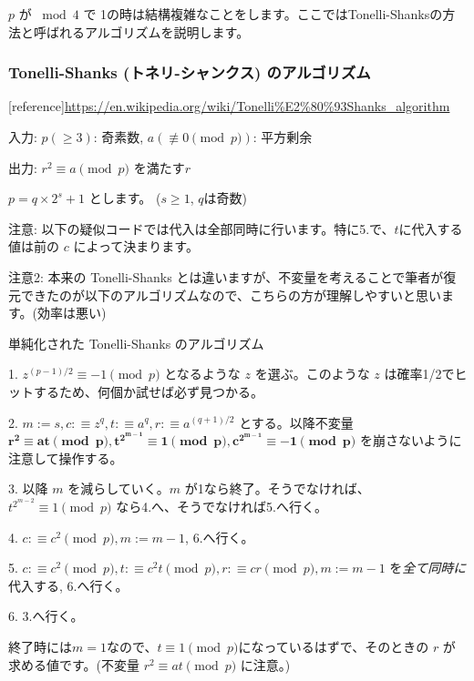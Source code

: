 \documentclass{report}
\begin{document}
$p$ が ${}\bmod 4$ で 1の時は結構複雑なことをします。ここではTonelli-Shanksの方法と呼ばれるアルゴリズムを説明します。

\subsubsection{Tonelli-Shanks (トネリ-シャンクス) のアルゴリズム}
[reference]\url{https://en.wikipedia.org/wiki/Tonelli%E2%80%93Shanks_algorithm}

入力: $p (\ge 3)$: 奇素数, $a (\not \equiv 0 \pmod p)$: 平方剰余

出力: $r^2 \equiv a \pmod p$ を満たす$r$

$p = q \times 2^s + 1$ とします。 ($s \ge 1$, $q$は奇数)

注意: 以下の疑似コードでは代入は全部同時に行います。特に5.で、$t$に代入する値は前の $c$ によって決まります。

注意2: 本来の Tonelli-Shanks とは違いますが、不変量を考えることで筆者が復元できたのが以下のアルゴリズムなので、こちらの方が理解しやすいと思います。(効率は悪い)

\begin{algorithm}                      
\caption{単純化された Tonelli-Shanks のアルゴリズム}
\label{alg1}
1. $z^{(p-1)/2} \equiv -1 \pmod p$ となるような $z$ を選ぶ。このような $z$ は確率1/2でヒットするため、何個か試せば必ず見つかる。

2. $m := s, c:\equiv z^q, t :\equiv a^q, r :\equiv a^{(q + 1)/2}$ とする。以降不変量 $\bm{r^2\equiv at \pmod p, t^{2^{m - 1}} \equiv 1 \pmod p, c^{2^{m-1}} \equiv -1 \pmod p}$ を崩さないように注意して操作する。

3. 以降 $m$ を減らしていく。$m$ が1なら終了。そうでなければ、$t^{2^{m-2}} \equiv 1 \pmod p$ なら4.へ、そうでなければ5.へ行く。

4. $c :\equiv c^2 \pmod p, m := m - 1$, 6.へ行く。

5. $c :\equiv c^2 \pmod p, t :\equiv c^2 t \pmod p, r :\equiv cr \pmod p, m := m - 1$ を\emph{全て同時に}代入する, 6.へ行く。

6. 3.へ行く。

\end{algorithm}
終了時には$m=1$なので、$t\equiv 1 \pmod p$になっているはずで、そのときの $r$ が求める値です。(不変量 $r^2\equiv at \pmod p$ に注意。)
\end{document}
